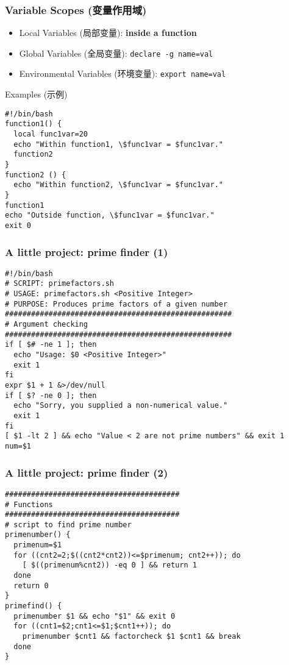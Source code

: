 \documentclass[red]{beamer}
\begin{document}
\begin{CJK*}{UTF8}{gbsn}
\begin{frame}
\frametitle{Variable Scopes (变量作用域)}
\begin{itemize}
	\item Local Variables (局部变量): \textbf{inside a function}
	\item Global Variables (全局变量): \lstinline{declare -g name=val}
	\item Environmental Variables (环境变量): \lstinline{export name=val}
\end{itemize}
\begin{block}{\centering Examples (示例)}
\begin{lstlisting}
#!/bin/bash
function1() {
  local func1var=20
  echo "Within function1, \$func1var = $func1var."
  function2
}
function2 () {
  echo "Within function2, \$func1var = $func1var."
}
function1
echo "Outside function, \$func1var = $func1var."
exit 0
\end{lstlisting}
\end{block}
\end{frame}


\begin{frame}
\frametitle{A little project: prime finder (1)}
\begin{lstlisting}
#!/bin/bash
# SCRIPT: primefactors.sh
# USAGE: primefactors.sh <Positive Integer>
# PURPOSE: Produces prime factors of a given number
####################################################
# Argument checking
####################################################
if [ $# -ne 1 ]; then
  echo "Usage: $0 <Positive Integer>"
  exit 1
fi
expr $1 + 1 &>/dev/null
if [ $? -ne 0 ]; then
  echo "Sorry, you supplied a non-numerical value."
  exit 1
fi
[ $1 -lt 2 ] && echo "Value < 2 are not prime numbers" && exit 1
num=$1
\end{lstlisting}
\end{frame}


\begin{frame}
\frametitle{A little project: prime finder (2)}
\begin{lstlisting}
########################################
# Functions
########################################
# script to find prime number
primenumber() {
  primenum=$1
  for ((cnt2=2;$((cnt2*cnt2))<=$primenum; cnt2++)); do
    [ $((primenum%cnt2)) -eq 0 ] && return 1
  done
  return 0
}
primefind() {
  primenumber $1 && echo "$1" && exit 0
  for ((cnt1=$2;cnt1<=$1;$cnt1++)); do
    primenumber $cnt1 && factorcheck $1 $cnt1 && break
  done
}
\end{lstlisting}
\end{frame}


\end{CJK*}
\end{document}
